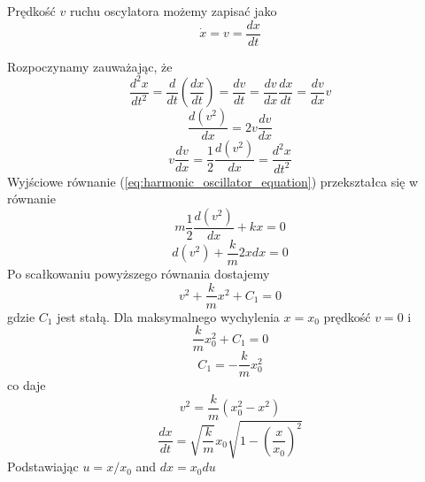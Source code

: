 \documentclass[12pt,a4paper,pl,fleqn]{article}
\begin{document}
Prędkość $v$ ruchu oscylatora możemy zapisać jako
\begin{equation}
\dot{x} = v = \frac{d x}{d t}
\end{equation}

Rozpoczynamy zauważając, że
\begin{equation}
\frac{d^2 x}{d t^2} = \frac{d}{d t} \left( \frac{d x}{d t} \right)  =  \frac{d v}{d t}  =   
\frac{d v}{d x} \frac{d x}{d t}
=    \frac{d v}{d x} v                             
\end{equation}
\begin{equation}
     \frac{d (v^2)}{d x}     =   2 v \frac{d v}{d x}  
\end{equation}
\begin{equation}
      v \frac{d v}{d x}   =  \frac{1}{2} \frac{d (v^2)}{d x} =  \frac{d^2 x}{d t^2}      
\end{equation}
Wyjściowe równanie (\ref{eq:harmonic_oscillator_equation}) przekształca się w równanie
\begin{equation}
     m \frac{1}{2} \frac{d (v^2)}{d x} +   k x = 0
\end{equation}
\begin{equation}
     d (v^2)   +   \frac{k}{m} 2 x dx = 0
\end{equation}
Po scałkowaniu powyższego równania dostajemy
\begin{equation}
     v^2  +  \frac{k}{m} x^2  +  C_{1}   =    0
\end{equation}
gdzie $C_{1}$ jest stałą. Dla maksymalnego wychylenia $x = x_{0}$ prędkość $v = 0$ i
\begin{equation}
      \frac{k}{m} x_{0}^2  +  C_{1}   =    0
\end{equation}
\begin{equation}
      C_{1} = - \frac{k}{m} x_{0}^2
\end{equation}
co daje
\begin{equation}
      v^2  = \frac{k}{m} \left( x_{0}^2 - x^2 \right)
\end{equation}
\begin{equation}
      \frac{d x}{d t}  =   \sqrt{\frac{k}{m}} x_{0} \sqrt{ 1 - \left( \frac{x}{x_{0}} \right)^2 }
\end{equation}
Podstawiając $u = x / x_{0}$ and $dx = x_{0} du$
\end{document}
